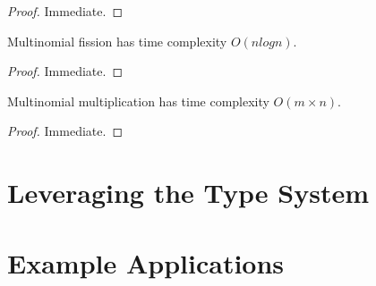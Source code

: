 \documentclass[thesis.tex]{subfiles}
\begin{document}
\begin{proof}
  Immediate.
\end{proof}


\begin{theorem}
  Multinomial fission has time complexity $O (n log n)$.
\end{theorem}

\begin{proof}
  Immediate.
\end{proof}


\begin{theorem}
  Multinomial multiplication has time complexity $O (m \times n)$.
\end{theorem}

\begin{proof}
  Immediate.
\end{proof}







\section{Leveraging the Type System}





\section{Example Applications}
\end{document}
